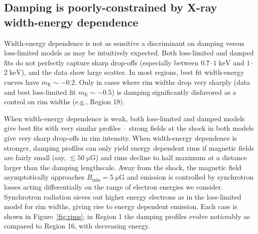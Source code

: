 \documentclass[iop, apj, numberedappendix]{emulateapj}
\newcommand*{\mt}{\mathrm}
\newcommand*{\unit}[1]{\;\mt{#1}}  %
\newcommand*{\mE}{m_\mt{E}}
\newcommand*{\muG}{\unit{\mu G}}
\begin{document}
\subsection{Damping is poorly-constrained by X-ray width-energy dependence}
\label{sec:damp-fit-disc}

Width-energy dependence is not as sensitive a discriminant on damping versus
loss-limited models as may be intuitively expected.  Both loss-limited and
damped fits do not perfectly capture sharp drop-offs (especially between
$0.7$--$1 \unit{keV}$ and $1$--$2 \unit{keV}$), and the data show large
scatter.  In most regions, best fit width-energy curves have $\mE \sim -0.2$.
Only in cases where rim widths drop very sharply (data and best loss-limited
fit $\mE \sim -0.5$) is damping significantly disfavored as a control on rim
widths (e.g., Region 18).



When width-energy dependence is weak, both loss-limited and damped models give
best fits with very similar profiles -- strong fields at the shock in both models
give very sharp drop-offs in rim intensity.  When width-energy dependence is
stronger, damping profiles can only yield energy dependent rims if magnetic
fields are fairly small (say, $\lesssim 50 \muG$) and rims decline to half
maximum at a distance larger than the damping lengthscale.  Away from the
shock, the magnetic field asymptotically approaches $B_{\mt{min}} = 5 \muG$ and
emission is controlled by synchrotron losses acting differentially on
the range of electron energies we consider.  Synchrotron radiation sieves out
higher energy electrons as in the loss-limited model for rim widths, giving
rise to energy dependent emission.  Each case is shown in
Figure~\ref{fig:rims}; in Region 1 the damping profiles evolve noticeably as
compared to Region 16, with decreasing energy.
\end{document}
